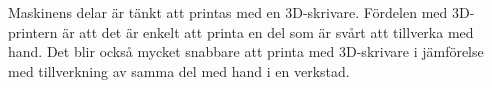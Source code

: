 Maskinens delar är tänkt att printas med en 3D-skrivare. Fördelen med 3D-printern är att det är enkelt att printa en del som är svårt att tillverka med hand. Det blir också mycket snabbare att printa med 3D-skrivare i jämförelse med tillverkning av samma del med hand i en verkstad. 